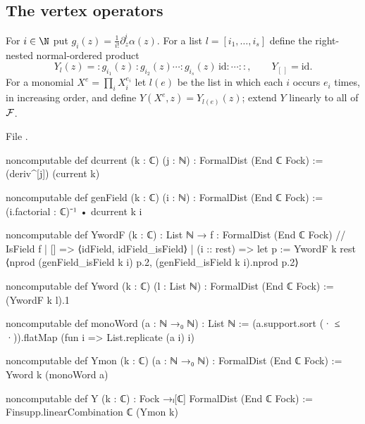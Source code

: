 \subsection{The vertex operators}

\begin{definition}\label{l05:def:Y}
For $i\in\N$ put $g_i(z)=\frac1{i!}\partial_z^i\alpha(z)$. For a list $l=[i_1,\ldots,i_s]$ define the
right-nested normal-ordered product
\begin{equation*}
 Y_l(z)={:}g_{i_1}(z)\,{:}g_{i_2}(z)\cdots{:}g_{i_s}(z)\,\mathrm{id}{:}\cdots{:}{:},
 \qquad Y_{[\,]}=\mathrm{id}.
\end{equation*}
For a monomial $X^e=\prod_iX_i^{e_i}$ let $l(e)$ be the list in which each $i$ occurs $e_i$ times, in
increasing order, and define $Y(X^e,z)=Y_{l(e)}(z)$; extend $Y$ linearly to all of $\mathcal{F}$.
\end{definition}

\noindent File .
\begin{leancode}
noncomputable def dcurrent (k : ℂ) (j : ℕ) : FormalDist (End ℂ Fock) :=
  (deriv^[j]) (current k)

noncomputable def genField (k : ℂ) (i : ℕ) : FormalDist (End ℂ Fock) :=
  (i.factorial : ℂ)⁻¹ • dcurrent k i

noncomputable def YwordF (k : ℂ) : List ℕ → { f : FormalDist (End ℂ Fock) // IsField f }
  | [] => ⟨idField, idField_isField⟩
  | (i :: rest) =>
      let p := YwordF k rest
      ⟨nprod (genField_isField k i) p.2, (genField_isField k i).nprod p.2⟩

noncomputable def Yword (k : ℂ) (l : List ℕ) : FormalDist (End ℂ Fock) := (YwordF k l).1

noncomputable def monoWord (a : ℕ →₀ ℕ) : List ℕ :=
  (a.support.sort (· ≤ ·)).flatMap (fun i => List.replicate (a i) i)

noncomputable def Ymon (k : ℂ) (a : ℕ →₀ ℕ) : FormalDist (End ℂ Fock) :=
  Yword k (monoWord a)

noncomputable def Y (k : ℂ) : Fock →ₗ[ℂ] FormalDist (End ℂ Fock) :=
  Finsupp.linearCombination ℂ (Ymon k)
\end{leancode}


